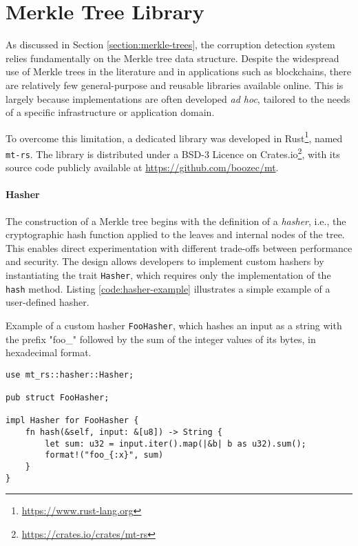 \section{Merkle Tree Library} \label{sec:merkle-tree-library}

As discussed in Section \ref{section:merkle-trees}, the corruption detection system relies fundamentally on the Merkle tree data structure. Despite the widespread use of Merkle trees in the literature and in applications such as blockchains, there are relatively few general-purpose and reusable libraries available online. This is largely because implementations are often developed \textit{ad hoc}, tailored to the needs of a specific infrastructure or application domain.

To overcome this limitation, a dedicated library was developed in Rust\footnote{\url{https://www.rust-lang.org}}, named \texttt{mt-rs}. The library is distributed under a BSD-3 Licence on Crates.io\footnote{\url{https://crates.io/crates/mt-rs}}, with its source code publicly available at \url{https://github.com/boozec/mt}.

\paragraph{Hasher}

The construction of a Merkle tree begins with the definition of a \textit{hasher}, i.e., the cryptographic hash function applied to the leaves and internal nodes of the tree. This enables direct experimentation with different trade-offs between performance and security. The design allows developers to implement custom hashers by instantiating the trait \texttt{Hasher}, which requires only the implementation of the \texttt{hash} method. Listing \ref{code:hasher-example} illustrates a simple example of a user-defined hasher.


\begin{listing}[!ht]
\caption{Example of a custom hasher \texttt{FooHasher}, which hashes an input as a string with the prefix "foo\_" followed by the sum of the integer values of its bytes, in hexadecimal format.}
\label{code:hasher-example}
\begin{verbatim}
use mt_rs::hasher::Hasher;

pub struct FooHasher;

impl Hasher for FooHasher {
    fn hash(&self, input: &[u8]) -> String {
        let sum: u32 = input.iter().map(|&b| b as u32).sum();
        format!("foo_{:x}", sum)
    }
}
\end{verbatim}
\end{listing}


